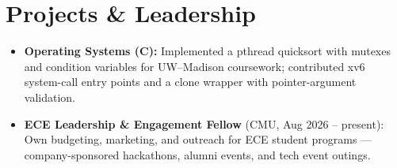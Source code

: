 \documentclass[11pt, letterpaper]{article}
\begin{document}
\section{Projects \& Leadership}
\begin{itemize}
  \item \textbf{Operating Systems (C):} Implemented a pthread quicksort with mutexes and condition variables for UW--Madison coursework; contributed xv6 system-call entry points and a clone wrapper with pointer-argument validation.
  \item \textbf{ECE Leadership \& Engagement Fellow} (CMU, Aug 2026 -- present): Own budgeting, marketing, and outreach for ECE student programs --- company-sponsored hackathons, alumni events, and tech event outings.
\end{itemize}
\end{document}
